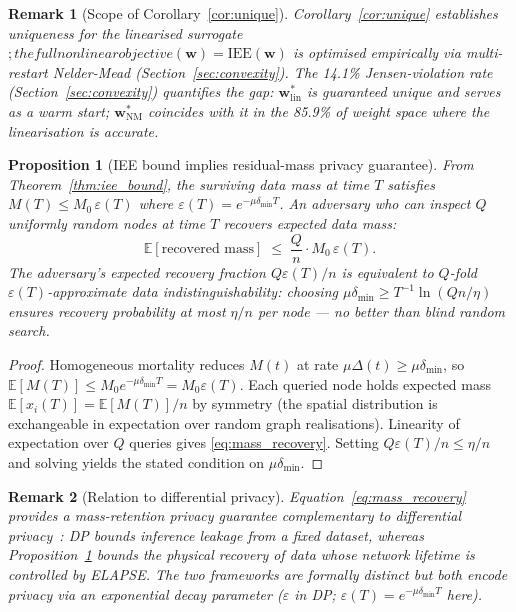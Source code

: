 \documentclass[review,12pt]{elsarticle}
\newcommand{\bfw}{\mathbf{w}}
\newcommand{\IEE}{\mathrm{IEE}}
\newtheorem{proposition}{Proposition}
\newtheorem{remark}{Remark}
\begin{document}
\begin{remark}[Scope of Corollary~\ref{cor:unique}]
\label{rem:corollary_scope}
Corollary~\ref{cor:unique} establishes uniqueness for the
\emph{linearised} surrogate {}$; the full nonlinear
objective (\bfw) = \IEE(\bfw)$ is optimised empirically via
multi-restart Nelder-Mead (Section~\ref{sec:convexity}).
The 14.1\% Jensen-violation rate (Section~\ref{sec:convexity})
quantifies the gap: $\bfw^*_{\mathrm{lin}}$ is guaranteed unique and
serves as a warm start; $\bfw^*_{\mathrm{NM}}$ coincides with it in
the 85.9\% of weight space where the linearisation is accurate.
\end{remark}

\begin{proposition}[IEE bound implies residual-mass privacy guarantee]
\label{prop:privacy}
From Theorem~\ref{thm:iee_bound}, the surviving data mass at time $T$
satisfies $M(T) \leq M_0\,\varepsilon(T)$ where
$\varepsilon(T) = e^{-\mu\delta_{\min}T}$.
An adversary who can inspect $Q$ uniformly random nodes at time $T$
recovers expected data mass:
\begin{equation}
  \mathbb{E}[\text{recovered mass}] \;\leq\;
    \frac{Q}{n}\cdot M_0\,\varepsilon(T).
  \label{eq:mass_recovery}
\end{equation}
The adversary's expected \emph{recovery fraction} $Q\varepsilon(T)/n$
is equivalent to $Q$-fold $\varepsilon(T)$-approximate data indistinguishability:
choosing $\mu\delta_{\min} \geq T^{-1}\ln(Qn/\eta)$ ensures recovery
probability at most $\eta/n$ per node --- no better than blind random search.
\end{proposition}

\begin{proof}
Homogeneous mortality reduces $M(t)$ at rate $\mu\Delta(t) \geq \mu\delta_{\min}$,
so $\mathbb{E}[M(T)] \leq M_0 e^{-\mu\delta_{\min}T} = M_0\varepsilon(T)$.
Each queried node holds expected mass $\mathbb{E}[x_i(T)] = \mathbb{E}[M(T)]/n$
by symmetry (the spatial distribution is exchangeable in expectation over
random graph realisations).  Linearity of expectation over $Q$ queries
gives \eqref{eq:mass_recovery}.  Setting $Q\varepsilon(T)/n \leq \eta/n$
and solving yields the stated condition on $\mu\delta_{\min}$.
\end{proof}

\begin{remark}[Relation to differential privacy]
\label{rem:dp}
Equation~\eqref{eq:mass_recovery} provides a \emph{mass-retention} privacy
guarantee complementary to differential privacy~\cite{dwork2014algorithmic}:
DP bounds inference leakage from a fixed dataset, whereas
Proposition~\ref{prop:privacy} bounds the \emph{physical recovery} of data
whose network lifetime is controlled by ELAPSE.  The two frameworks are
formally distinct but both encode privacy via an exponential decay parameter
($\varepsilon$ in DP; $\varepsilon(T)=e^{-\mu\delta_{\min}T}$ here).
\end{remark}
\end{document}
